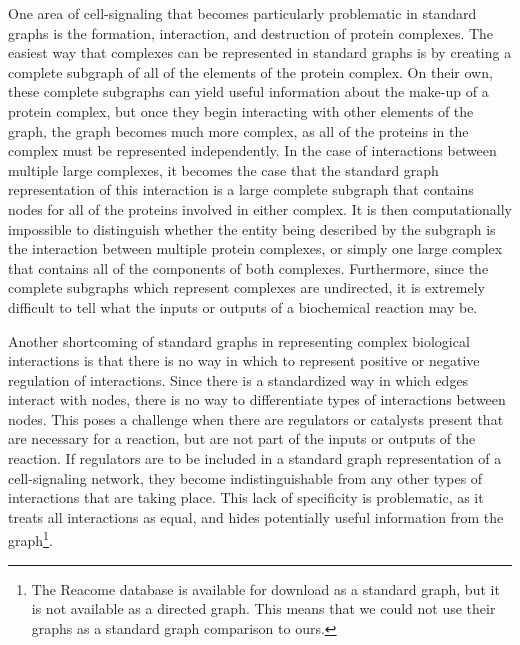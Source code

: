 \documentclass[12pt,twoside]{reedthesis}
\theoremstyle{definition}
\begin{document}
One area of cell-signaling that becomes particularly problematic in standard graphs is the formation, interaction, and destruction of protein complexes.  The easiest way that complexes can be represented in standard graphs is by creating a complete subgraph of all of the elements of the protein complex.  On their own, these complete subgraphs can yield useful information about the make-up of a protein complex, but once they begin interacting with other elements of the graph, the graph becomes much more complex, as all of the proteins in the complex must be represented independently.  In the case of interactions between multiple large complexes, it becomes the case that the standard graph representation of this interaction is a large complete subgraph that contains nodes for all of the proteins involved in either complex.  It is then computationally impossible to distinguish whether the entity being described by the subgraph is the interaction between multiple protein complexes, or simply one large complex that contains all of the components of both complexes.  Furthermore, since the complete subgraphs which represent complexes are undirected, it is extremely difficult to tell what the inputs or outputs of a biochemical reaction may be.\par

Another shortcoming of standard graphs in representing complex biological interactions is that there is no way in which to represent positive or negative regulation of interactions.  Since there is a standardized way in which edges interact with nodes, there is no way to differentiate types of interactions between nodes.  This poses a challenge when there are regulators or catalysts present that are necessary for a reaction, but are not part of the inputs or outputs of the reaction.  If regulators are to be included in a standard graph representation of a cell-signaling network, they become indistinguishable from any other types of interactions that are taking place.  This lack of specificity is problematic, as it treats all interactions as equal, and hides potentially useful information from the graph\footnote{The Reacome database is available for download as a standard graph, but it is not available as a directed graph. This means that we could not use their graphs as a standard graph comparison to ours.}.\par
\end{document}
